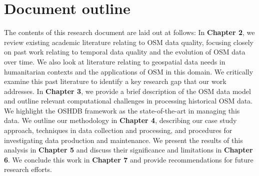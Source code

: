 \section{Document outline}

The contents of this research document are laid out at follows: In \textbf{Chapter 2}, we review existing academic literature relating to OSM data quality, focusing closely on past work relating to temporal data quality and the evolution of OSM data over time. We also look at literature relating to geospatial data needs in humanitarian contexts and the applications of OSM in this domain. We critically examine this past literature to identify a key research gap that our work addresses. In \textbf{Chapter 3}, we provide a brief description of the OSM data model and outline relevant computational challenges in processing historical OSM data. We highlight the OSHDB framework \parencite{raifer_oshdb_2019} as the state-of-the-art in managing this data. We outline our methodology in \textbf{Chapter 4}, describing our case study approach, techniques in data collection and processing, and procedures for investigating data production and maintenance. We present the results of this analysis in \textbf{Chapter 5} and discuss their significance and limitations in \textbf{Chapter 6}. We conclude this work in \textbf{Chapter 7} and provide recommendations for future research efforts. 

